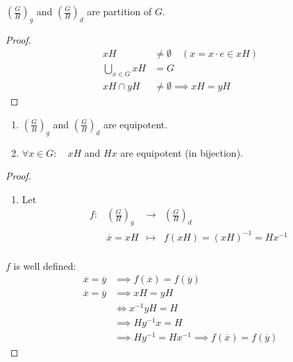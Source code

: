 \begin{proposition}[]
$\left( \frac{G}{H}\right)_{g }$ and 
$\left( \frac{G}{H} \right)_{d}$ are partition 
of $G$. 
\end{proposition}
\begin{proof}
\begin{align*}
  xH & \neq   \emptyset \quad (x = x \cdot  e \in  x H)  \\
     \bigcup_{x \in  G}^{} x H &= G \\
     x H \cap y H & \neq \emptyset  \implies xH = yH
\end{align*}
\end{proof}
\begin{proposition}[]
  \begin{enumerate}
  \item 
$\left( \frac{G}{H} \right)_{g} $ and $\left( \frac{G}{H}\right)_{d} $ are equipotent.
\item $\forall x \in G: \quad  xH$ and $Hx $ are equipotent (in bijection).
  \end{enumerate}
\end{proposition}
\begin{proof}
\begin{enumerate}
\item Let 
  \[
  \begin{array}{cccc}
        f : &  \left( \frac{G}{H} \right)_{g}  & \longrightarrow & \left( \frac{G}{H} \right)_{d} \\
  
             &  \overline{x} = x H  & \longmapsto     & f(xH)  = 
             \left( x H \right)^{-1} = H x^{-1} \\ 
  \end{array}
  \]
\end{enumerate}
$f $ is well defined: 
\begin{align*}
  \overline{x} = \overline{y} & \implies 
  f(\overline{x})  = 
  f( \overline{y})  
  \\
  \overline{x} = \overline{y} & \implies 
  x H = y H  \\
                              & 
                              \iff x^{-1} y H = H 
                              \\
                              & \implies  H y^{-1} x = H
                              \\
                              & \implies 
                              H y^{-1} = H x^{-1} 
                              \implies  
                              f(\overline{x})  = f(\overline{y}) 
\end{align*}
\end{proof}
